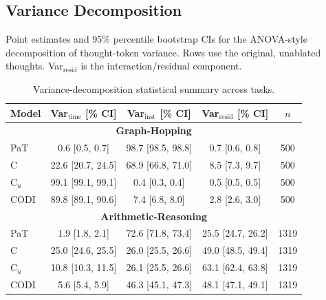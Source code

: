 \subsection{Variance Decomposition}
\label{app:variance_decomposition_stats}

Point estimates and 95\% percentile bootstrap CIs for the ANOVA-style decomposition of thought-token variance. Rows use the original, unablated thoughts. Var$_\text{resid}$ is the interaction/residual component.

\begin{table}[h!]
\centering
\small
\setlength{\tabcolsep}{4pt}
\caption{Variance-decomposition statistical summary across tasks.}
\begin{tabular}{l ccc c}
\toprule
Model & Var$_\text{time}$ [\% CI] & Var$_\text{inst}$ [\% CI] & Var$_\text{resid}$ [\% CI] & $n$ \\
\midrule
\multicolumn{5}{c}{\textbf{Graph-Hopping}} \\
\midrule
PaT & 0.6 [0.5, 0.7] & 98.7 [98.5, 98.8] & 0.7 [0.6, 0.8] & 500 \\
C & 22.6 [20.7, 24.5] & 68.9 [66.8, 71.0] & 8.5 [7.3, 9.7] & 500 \\
C$_u$ & 99.1 [99.1, 99.1] & 0.4 [0.3, 0.4] & 0.5 [0.5, 0.5] & 500 \\
CODI & 89.8 [89.1, 90.6] & 7.4 [6.8, 8.0] & 2.8 [2.6, 3.0] & 500 \\
\midrule
\multicolumn{5}{c}{\textbf{Arithmetic-Reasoning}} \\
\midrule
PaT & 1.9 [1.8, 2.1] & 72.6 [71.8, 73.4] & 25.5 [24.7, 26.2] & 1319 \\
C & 25.0 [24.6, 25.5] & 26.0 [25.5, 26.6] & 49.0 [48.5, 49.4] & 1319 \\
C$_u$ & 10.8 [10.3, 11.5] & 26.1 [25.5, 26.6] & 63.1 [62.4, 63.8] & 1319 \\
CODI & 5.6 [5.4, 5.9] & 46.3 [45.1, 47.3] & 48.1 [47.1, 49.1] & 1319 \\
\bottomrule
\end{tabular}
\label{tab:variance_decomposition_stats_combined}
\end{table}
